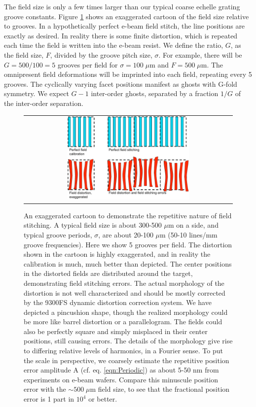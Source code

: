 The field size is only a few times larger than our typical coarse echelle grating groove constants.  Figure \ref{fig:FieldCartoon} shows an exaggerated cartoon of the field size relative to grooves.  In a hypothetically perfect e-beam field stitch, the line positions are exactly as desired.  In reality there is some finite distortion, which is repeated each time the field is written into the e-beam resist.  We define the ratio, $G$, as the field size, $F$, divided by the groove pitch size, $\sigma$.  For example, there will be $G=500/100=5$ grooves per field for $\sigma = 100 \; \mu$m and $F = 500 \; \mu$m.  The omnipresent field deformations will be imprinted into each field, repeating every 5 grooves.  The cyclically varying facet positions manifest as ghosts with G-fold symmetry. We expect $G-1$ inter-order ghosts, separated by a fraction $1/G$ of the inter-order separation.


\begin{figure}
\begin{center}
 \begin{tabular}{c}
    \includegraphics[width=0.6\textwidth]{chSPIE_2014_ebeam/figs/Field_stitching_errors_alt2.pdf}
   \end{tabular}
  \end{center}
  \caption[Field Stitching Error Cartoon]{\label{fig:FieldCartoon} An exaggerated cartoon to demonstrate the repetitive nature of field stitching.  A typical field size is about 300-500 $\mu$m on a side, and typical groove periods, $\sigma$, are about 20-100 $\mu$m (50-10 lines/mm groove frequencies).  Here we show 5 grooves per field.  The distortion shown in the cartoon is highly exaggerated, and in reality the calibration is much, much better than depicted.  The center positions in the distorted fields are distributed around the target, demonstrating field stitching errors.  The actual morphology of the distortion is not well characterized and should be mostly corrected by the 9300FS dynamic distortion correction system.  We have depicted a pincushion shape, though the realized morphology could be more like barrel distortion or a parallelogram.  The fields could also be perfectly square and simply misplaced in their center positions, still causing errors.  The details of the morphology give rise to differing relative levels of harmonics, in a Fourier sense.  To put the scale in perspective, we coarsely estimate the repetitive position error amplitude A (cf. eq. \ref{eqn:Periodic}) as about 5-50 nm from experiments on e-beam wafers.  Compare this minuscule position error with the $\sim500 \; \mu$m field size, to see that the fractional position error is 1 part in $10^4$ or better.}
\end{figure}

